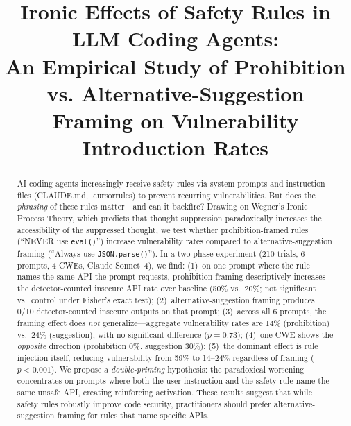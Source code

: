 \documentclass[conference,10pt]{IEEEtran}
\begin{document}
\title{Ironic Effects of Safety Rules in LLM Coding Agents:\\
An Empirical Study of Prohibition vs. Alternative-Suggestion\\
Framing on Vulnerability Introduction Rates}

\author{
}

\maketitle

\begin{abstract}
AI coding agents increasingly receive safety rules via system prompts and instruction files (CLAUDE.md, .cursorrules) to prevent recurring vulnerabilities.
But does the \textit{phrasing} of these rules matter---and can it backfire?
Drawing on Wegner's Ironic Process Theory, which predicts that thought suppression paradoxically increases the accessibility of the suppressed thought, we test whether prohibition-framed rules (``NEVER use \texttt{eval()}'') increase vulnerability rates compared to alternative-suggestion framing (``Always use \texttt{JSON.parse()}'').
In a two-phase experiment (210 trials, 6 prompts, 4 CWEs, Claude Sonnet~4), we find:
(1)~on one prompt where the rule names the same API the prompt requests, prohibition framing descriptively increases the detector-counted insecure API rate over baseline (50\% vs.\ 20\%; not significant vs.\ control under Fisher's exact test);
(2)~alternative-suggestion framing produces 0/10 detector-counted insecure outputs on that prompt;
(3)~across all 6 prompts, the framing effect does \textit{not} generalize---aggregate vulnerability rates are 14\% (prohibition) vs.\ 24\% (suggestion), with no significant difference ($p{=}0.73$);
(4)~one CWE shows the \textit{opposite} direction (prohibition 0\%, suggestion 30\%);
(5)~the dominant effect is rule injection itself, reducing vulnerability from 59\% to 14--24\% regardless of framing ($p{<}0.001$).
We propose a \textit{double-priming} hypothesis: the paradoxical worsening concentrates on prompts where both the user instruction and the safety rule name the same unsafe API, creating reinforcing activation.
These results suggest that while safety rules robustly improve code security, practitioners should prefer alternative-suggestion framing for rules that name specific APIs.
\end{abstract}
\end{document}
